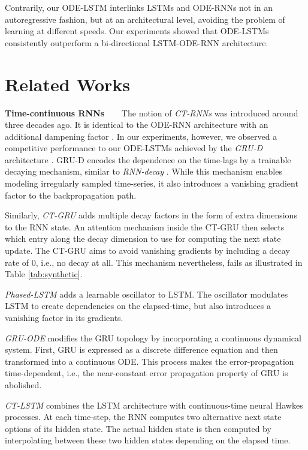 \documentclass{article}
\begin{document}
Contrarily, our ODE-LSTM interlinks LSTMs and ODE-RNNs not in an autoregressive fashion, but at an architectural level, avoiding the problem of learning at different speeds. Our experiments showed that ODE-LSTMs consistently outperform a bi-directional LSTM-ODE-RNN architecture.

\section{Related Works}
\textbf{Time-continuous RNNs~~~} The notion of \textit{CT-RNNs} \cite{funahashi1993approximation} was introduced around three decades ago. It is identical to the ODE-RNN architecture \cite{rubanova2019latent} with an additional dampening factor . In our experiments, however, we observed a competitive performance to our ODE-LSTMs achieved by the \textit{GRU-D} architecture \cite{che2018recurrent}. GRU-D encodes the dependence on the time-lags by a trainable decaying mechanism, similar to \textit{RNN-decay} \cite{rubanova2019latent}. While this mechanism enables modeling irregularly sampled time-series, it also introduces a vanishing gradient factor to the backpropagation path. 

Similarly, \textit{CT-GRU} \cite{mozer2017discrete} adds multiple decay factors in the form of extra dimensions to the RNN state. An attention mechanism inside the CT-GRU then selects which entry along the decay dimension to use for computing the next state update. The CT-GRU aims to avoid vanishing gradients by including a decay rate of 0, i.e., no decay at all. This mechanism nevertheless, fails as illustrated in Table \ref{tab:synthetic}. 

\textit{Phased-LSTM} \cite{neil2016phased} adds a learnable oscillator to LSTM. The oscillator modulates LSTM to create dependencies on the elapsed-time, but also introduces a vanishing factor in its gradients. 

\textit{GRU-ODE} \cite{de2019gru} modifies the GRU \cite{chung2014empirical} topology by incorporating a continuous dynamical system. First, GRU is expressed as a discrete difference equation and then transformed into a continuous ODE. This process makes the error-propagation time-dependent, i.e., the near-constant error propagation property of GRU is abolished. 


\textit{CT-LSTM} \cite{mei2017neural} combines the LSTM architecture with continuous-time neural Hawkes processes. At each time-step, the RNN computes two alternative next state options of its hidden state. The actual hidden state is then computed by interpolating between these two hidden states depending on the elapsed time.
\end{document}
